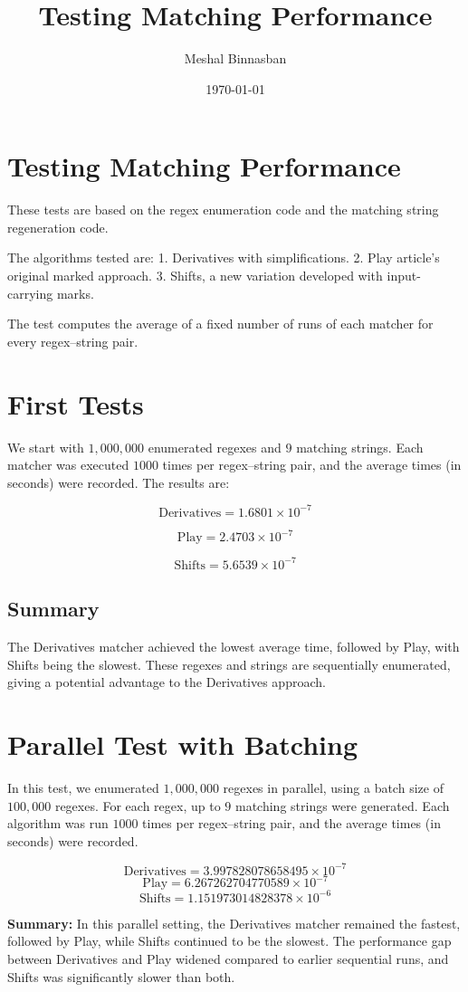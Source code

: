 \documentclass[12pt]{article}
\title{Testing Matching Performance}
\author{Meshal Binnasban}
\date{\today}
\begin{document}
\maketitle
\newpage

\section*{Testing Matching Performance}
These tests are based on the regex enumeration code and the matching string regeneration code.

The algorithms tested are:  
1. Derivatives with simplifications.  
2. Play article's original marked approach.  
3. Shifts, a new variation developed with input-carrying marks.

The test computes the average of a fixed number of runs of each matcher for every regex–string pair.

\section{First Tests}
We start with $1{,}000{,}000$ enumerated regexes and $9$ matching strings.  
Each matcher was executed $1000$ times per regex–string pair, and the average times  
(in seconds) were recorded. The results are:

\[
\text{Derivatives} = 1.6801 \times 10^{-7}
\]

\[
\text{Play} = 2.4703 \times 10^{-7}
\]

\[
\text{Shifts} = 5.6539 \times 10^{-7}
\]

\subsection*{Summary}
The Derivatives matcher achieved the lowest average time, followed by Play, with Shifts being the slowest.  
These regexes and strings are sequentially enumerated, giving a potential advantage to the Derivatives approach.

\section{Parallel Test with Batching}
In this test, we enumerated $1{,}000{,}000$ regexes in parallel,  
using a batch size of $100{,}000$ regexes.  
For each regex, up to $9$ matching strings were generated.  
Each algorithm was run $1000$ times per regex--string pair,  
and the average times (in seconds) were recorded.

\[
\text{Derivatives} = 3.997828078658495 \times 10^{-7}
\]
\[
\text{Play} = 6.267262704770589 \times 10^{-7}
\]
\[
\text{Shifts} = 1.151973014828378 \times 10^{-6}
\]

\noindent
\textbf{Summary:} In this parallel setting, the Derivatives matcher remained the fastest,  
followed by Play, while Shifts continued to be the slowest.  
The performance gap between Derivatives and Play widened compared to earlier sequential runs,  
and Shifts was significantly slower than both.
\end{document}
